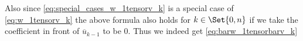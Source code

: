 Also since \cref{eq:special_cases_w_1tensorv_k} is a special case of \cref{eq:w_1tensorv_k} the above formula also holds for $k\in\Set{0,n}$ if we take the coefficient in front of $\overline u_{k-1}$ to be $0$. Thus we indeed get \cref{eq:barw_1tensorbarv_k}


